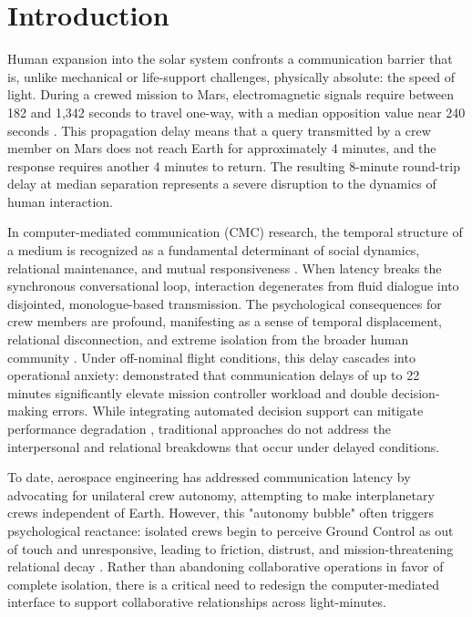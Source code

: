 \documentclass[12pt,a4paper]{article}
\begin{document}
\newpage

\section{Introduction}

Human expansion into the solar system confronts a communication barrier that is, unlike mechanical or life-support challenges, physically absolute: the speed of light. During a crewed mission to Mars, electromagnetic signals require between 182 and 1,342 seconds to travel one-way, with a median opposition value near 240 seconds \citep{nasa_ola_2023}. This propagation delay means that a query transmitted by a crew member on Mars does not reach Earth for approximately 4 minutes, and the response requires another 4 minutes to return. The resulting 8-minute round-trip delay at median separation represents a severe disruption to the dynamics of human interaction.

In computer-mediated communication (CMC) research, the temporal structure of a medium is recognized as a fundamental determinant of social dynamics, relational maintenance, and mutual responsiveness \citep{walther1992}. When latency breaks the synchronous conversational loop, interaction degenerates from fluid dialogue into disjointed, monologue-based transmission. The psychological consequences for crew members are profound, manifesting as a sense of temporal displacement, relational disconnection, and extreme isolation from the broader human community \citep{kanas2017}. Under off-nominal flight conditions, this delay cascades into operational anxiety: \citet{diamond2025} demonstrated that communication delays of up to 22 minutes significantly elevate mission controller workload and double decision-making errors. While integrating automated decision support can mitigate performance degradation \citep{mavrakis2025}, traditional approaches do not address the interpersonal and relational breakdowns that occur under delayed conditions.

To date, aerospace engineering has addressed communication latency by advocating for unilateral crew autonomy, attempting to make interplanetary crews independent of Earth. However, this "autonomy bubble" often triggers psychological reactance: isolated crews begin to perceive Ground Control as out of touch and unresponsive, leading to friction, distrust, and mission-threatening relational decay \citep{kanas2017}. Rather than abandoning collaborative operations in favor of complete isolation, there is a critical need to redesign the computer-mediated interface to support collaborative relationships across light-minutes.
\end{document}
